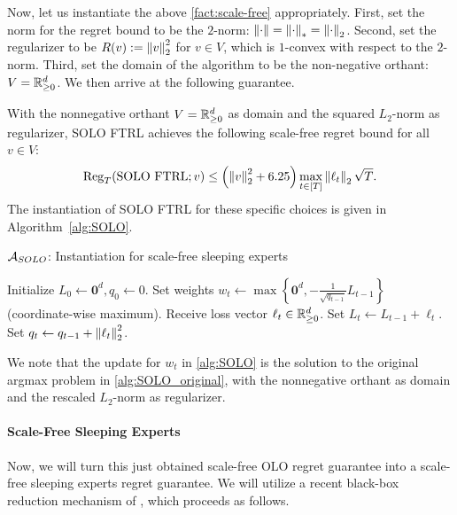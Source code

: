Now, let us instantiate the above \cref{fact:scale-free} appropriately. First, set the norm for the regret bound to be the $2$-norm: $\left\lVert\cdot\right\rVert = \left\lVert\cdot\right\rVert_* = \left\lVert\cdot\right\rVert_2$. Second, set the regularizer to be $R(v) := \left\lVert v\right\rVert^2_2$ for $v \in V$, which is $1$-convex with respect to the $2$-norm. Third, set the domain of the algorithm to be the non-negative orthant: $V = \mathbb{R}^d_{\geq 0}$. 
We then arrive at the following guarantee.

\begin{corollary} \label{cor:SOLO}
    With the nonnegative orthant $V = \mathbb{R}^d_{\geq 0}$ as domain and the squared $L_2$-norm as regularizer, SOLO FTRL achieves the following scale-free regret bound for all $v \in V$:
    \[
    \mathrm{Reg}_T(\mathrm{SOLO \ FTRL}; v) \leq \left(\left\lVert v\right\rVert^2_2 + 6.25\right) \max_{t \in [T]} \left\lVert\ell_t\right\rVert_2 \sqrt{T}.
    \]
%
    The instantiation of SOLO FTRL for these specific choices is given in Algorithm~\ref{alg:SOLO}.
\end{corollary}

\begin{algorithm}
\caption{$\mathcal{A}_{SOLO}$: Instantiation for scale-free sleeping experts}
\label{alg:SOLO}

\begin{algorithmic}[1]
\STATE Initialize $L_0 \gets \textbf{0}^d, q_0 \gets 0$.
    \STATE Set weights $w_t \gets \max \left\{ \textbf{0}^d , - \frac{1}{\sqrt{q_{t-1}}}L_{t-1} \right\}$ (coordinate-wise maximum).
    \STATE Receive loss vector $\ell_t \in \mathbb{R}^d_{\geq 0}$.
    \STATE Set $L_t \gets L_{t-1} + \ell_t$.
    \STATE Set $q_t \gets q_{t-1} + \left\lVert\ell_{t}\right\rVert^2_2$.
\ENDFOR
\end{algorithmic}
\end{algorithm}

We note that the update for $w_t$ in \cref{alg:SOLO} is the solution to the original argmax problem in \cref{alg:SOLO_original}, with the nonnegative orthant as domain and the rescaled $L_2$-norm as regularizer.

\paragraph{Scale-Free Sleeping Experts} Now, we will turn this just obtained scale-free OLO regret guarantee into a scale-free sleeping experts regret guarantee. We will utilize a recent black-box reduction mechanism of \citet{SleepingExpertsOrabona}, which proceeds as follows.

